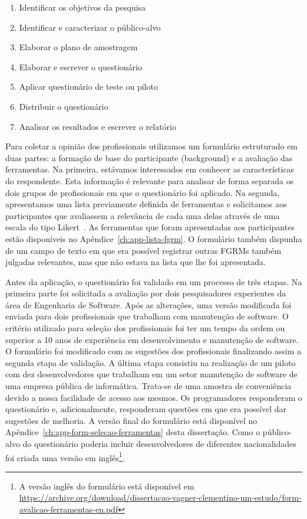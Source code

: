 \begin{enumerate}
    \item{Identificar os objetivos da pesquisa}
    \item{Identificar e caracterizar o público-alvo}
    \item{Elaborar o plano de amostragem}
    \item{Elaborar e escrever o questionário}
    \item{Aplicar questionário de teste ou piloto}
    \item{Distribuir o questionário}
    \item{Analisar os resultados e escrever o relatório}
\end{enumerate}

Para coletar a opinião dos profissionais utilizamos um formulário estruturado
em duas partes: a formação de base do participante (background) e a avaliação
das ferramentas. Na primeira, estávamos interessados em conhecer as
características do respondente. Esta informação é relevante para analisar de
forma separada os dois grupos de profissionais em que o questionário foi
aplicado. Na segunda, apresentamos uma lista previamente definida de
ferramentas e solicitamos aos participantes que avaliassem a relevância de cada
uma delas através de uma escala do tipo Likert~\cite{robbins2011plotting}. As
ferramentas que foram apresentadas aos participantes estão disponíveis no
Apêndice~\ref{ch:app-lista-fgrm}. O formulário também dispunha de um campo de
texto em que era possível registrar outras FGRMs também julgadas relevantes,
mas que não estava na lista que lhe foi apresentada.

Antes da aplicação, o questionário foi validado em um processo de três etapas.
Na primeira parte foi solicitada a avaliação por dois pesquisadores experientes
da área de Engenharia de Software. Após as alterações, uma versão modificada
foi enviada para dois profissionais que trabalham com manutenção de software. O
critério utilizado para seleção dos profissionais foi ter um tempo da ordem ou
superior a 10 anos de experiência em desenvolvimento e manutenção de software.
O formulário foi modificado com as sugestões dos profissionais finalizando
assim a segunda etapa de validação.  A última etapa consistiu na realização de
um piloto com dez desenvolvedores que trabalham em um setor manutenção de
software de uma empresa pública de informática. Trata-se de uma amostra de
conveniência devido a nossa facilidade de acesso aos mesmos. Os programadores
responderam o questionário e, adicionalmente, responderam questões em que era
possível dar sugestões de melhoria. A versão final do formulário está
disponível no Apêndice~\ref{ch:app-form-selecao-ferramentas} desta dissertação.
Como o público-alvo do questionário poderia incluir desenvolvedores de
diferentes nacionalidades foi criada uma versão em inglês\footnote{A versão
    inglês do formulário está disponível em
    \url{https://archive.org/download/dissertacao-vagner-clementino-um-estudo/form-avalicao-ferramentas-en.pdf}}.

